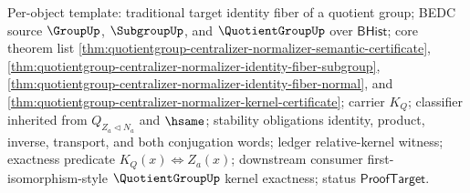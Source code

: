 Per-object template: traditional target identity fiber of a quotient group;
BEDC source $\GroupUp$, $\SubgroupUp$, and $\QuotientGroupUp$ over
$\mathsf{BHist}$; core theorem list
\autoref{thm:quotientgroup-centralizer-normalizer-semantic-certificate},
\autoref{thm:quotientgroup-centralizer-normalizer-identity-fiber-subgroup},
\autoref{thm:quotientgroup-centralizer-normalizer-identity-fiber-normal}, and
\autoref{thm:quotientgroup-centralizer-normalizer-kernel-certificate}; carrier
$K_Q$; classifier inherited from $Q_{Z_a\triangleleft N_a}$ and $\hsame$;
stability obligations identity, product, inverse, transport, and both
conjugation words; ledger relative-kernel witness; exactness predicate
$K_Q(x)\Longleftrightarrow Z_a(x)$; downstream consumer first-isomorphism-style
$\QuotientGroupUp$ kernel exactness; status $\mathsf{ProofTarget}$.

